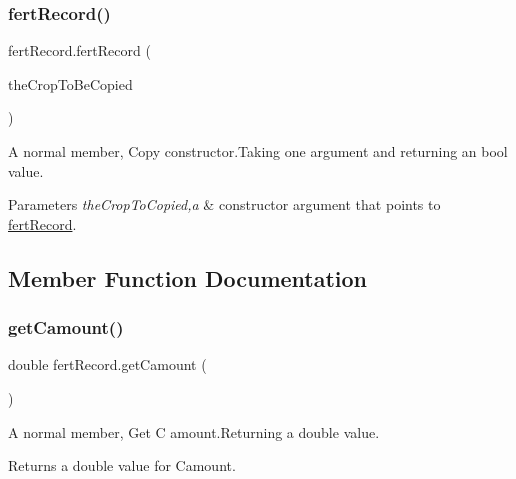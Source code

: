 \subsubsection{\texorpdfstring{fertRecord()}{fertRecord()}}
{\footnotesize\ttfamily fert\+Record.\+fert\+Record (\begin{DoxyParamCaption}\item[{\mbox{\hyperlink{classfert_record}{fert\+Record}}}]{the\+Crop\+To\+Be\+Copied }\end{DoxyParamCaption})\hspace{0.3cm}{\ttfamily [inline]}}



A normal member, Copy constructor.\+Taking one argument and returning an bool value. 


\begin{DoxyParams}{Parameters}
{\em the\+Crop\+To\+Copied,a} & constructor argument that points to \mbox{\hyperlink{classfert_record}{fert\+Record}}. \\
\hline
\end{DoxyParams}


\subsection{Member Function Documentation}
\mbox{\label{classfert_record_a21f44353a6a878ec133439ecd292ced0}} 
\subsubsection{\texorpdfstring{getCamount()}{getCamount()}}
{\footnotesize\ttfamily double fert\+Record.\+get\+Camount (\begin{DoxyParamCaption}{ }\end{DoxyParamCaption})\hspace{0.3cm}{\ttfamily [inline]}}



A normal member, Get C amount.\+Returning a double value. 

\begin{DoxyReturn}{Returns}
a double value for Camount. 
\end{DoxyReturn}
\mbox{\label{classfert_record_a1e2f4731531fa9da8db76417ad42df1c}} 
